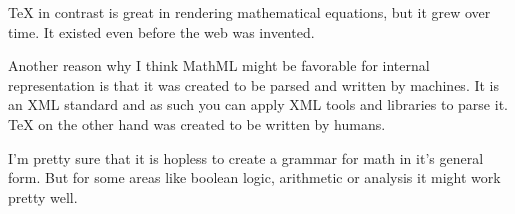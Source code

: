 \documentclass[a4paper]{scrartcl}
\begin{document}
\TeX{} in contrast is great in rendering mathematical equations,
but it grew over time. It existed even before the web was invented.

Another reason why I think MathML might be favorable for internal
representation is that it was created to be parsed and written by
machines. It is an XML standard and as such you can apply XML tools
and libraries to parse it. \TeX{} on the other hand was created
to be written by humans.

I'm pretty sure that it is hopless to create a grammar for math
in it's general form. But for some areas like boolean logic, arithmetic
or analysis it might work pretty well.
\end{document}
